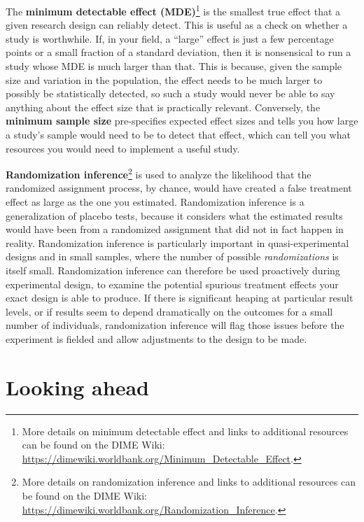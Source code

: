 \documentclass[
]{book}
\begin{document}
The \textbf{minimum detectable effect (MDE)}\footnote{More details on minimum detectable effect and
  links to additional resources can be found on the DIME Wiki:
  \url{https://dimewiki.worldbank.org/Minimum_Detectable_Effect}.}
is the smallest true effect that a given research design can reliably detect.
This is useful as a check on whether a study is worthwhile.
If, in your field, a ``large'' effect is just a few percentage points
or a small fraction of a standard deviation,
then it is nonsensical to run a study whose MDE is much larger than that.
This is because, given the sample size and variation in the population,
the effect needs to be much larger to possibly be statistically detected,
so such a study would never be able to say anything about the effect size that is practically relevant.
Conversely, the \textbf{minimum sample size} pre-specifies expected effect sizes
and tells you how large a study's sample would need to be to detect that effect,
which can tell you what resources you would need
to implement a useful study.

\textbf{Randomization inference}\footnote{More details on randomization inference and
  links to additional resources can be found on the DIME Wiki:
  \url{https://dimewiki.worldbank.org/Randomization_Inference}.}
is used to analyze the likelihood
that the randomized assignment process, by chance,
would have created a false treatment effect as large as the one you estimated.
Randomization inference is a generalization of placebo tests,
because it considers what the estimated results would have been
from a randomized assignment that did not in fact happen in reality.
Randomization inference is particularly important
in quasi-experimental designs and in small samples,
where the number of possible \emph{randomizations} is itself small.
Randomization inference can therefore be used proactively during experimental design,
to examine the potential spurious treatment effects your exact design is able to produce.
If there is significant heaping at particular result levels,
or if results seem to depend dramatically on the outcomes for a small number of individuals,
randomization inference will flag those issues before the experiment is fielded
and allow adjustments to the design to be made.

\hypertarget{looking-ahead-3}{%
\section*{Looking ahead}\label{looking-ahead-3}}
\end{document}
